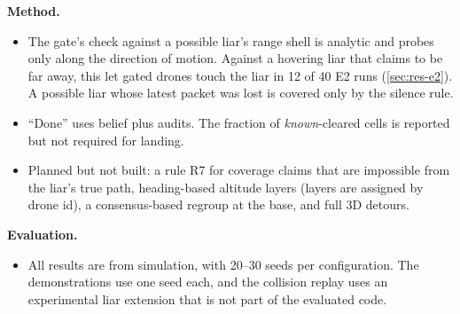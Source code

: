 \textbf{Method.}
\begin{itemize}
    \item The gate's check against a possible liar's range shell is analytic and probes only along the direction of
          motion. Against a hovering liar that claims to be far away, this let gated drones touch the liar in 12 of 40
          E2 runs (\autoref{sec:res-e2}). A possible liar whose latest packet was lost is covered only by the silence
          rule.
    \item ``Done'' uses belief plus audits. The fraction of \emph{known}-cleared cells is reported but not required for
          landing.
    \item Planned but not built: a rule R7 for coverage claims that are impossible from the liar's true path,
          heading-based altitude layers (layers are assigned by drone id), a consensus-based regroup at the base, and
          full 3D detours.
\end{itemize}

\textbf{Evaluation.}
\begin{itemize}
    \item All results are from simulation, with 20--30 seeds per configuration. The demonstrations use one seed each,
          and the collision replay uses an experimental liar extension that is not part of the evaluated code.
\end{itemize}
